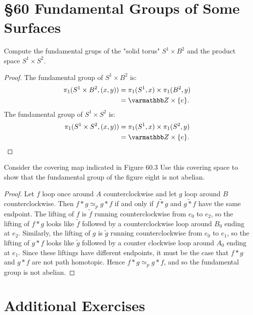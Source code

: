 \documentclass[10pt,oneside,openany]{memoir}
\begin{document}
\section*{\S 60 Fundamental Groups of Some Surfaces}
\begin{exercise}[manual-num={1}]
	Compute the fundamental grups of the "solid torus" $S^1 \times B^2$ and the product space $S^1 \times S^2$.
\end{exercise}
	\begin{proof}
		The fundamental group of $S^1 \times B^2$ is:
		\begin{align*}
			\pi_1(S^1 \times B^2, (x,y))
			&= \pi_1(S^1,x) \times \pi_1(B^2,y) \\
			&= \bfZ \times \{e\}.	
		\end{align*}
		The fundamental group of $S^1 \times S^2$ is:
		\begin{align*}
			\pi_1(S^1 \times S^2, (x,y))
			&= \pi_1(S^1,x) \times \pi_1(S^2,y) \\
			&= \bfZ \times \{e\}.	
		\end{align*}
	\end{proof}
\begin{exercise}[manual-num={5}]
	Consider the covering map indicated in Figure 60.3 Use this covering space to show that the fundamental group of the figure eight is not abelian.
\end{exercise}
	\begin{proof}
		Let $f$ loop once around $A$ counterclockwise and let $g$ loop around $B$ counterclockwise. Then $f \ast g \simeq_p g \ast f$ if and only if $\tilde{f \ast g}$ and $\tilde{g \ast f}$ have the same endpoint. The lifting of $f$ is $\tilde{f}$ running counterclockwise from $e_0$ to $e_2$, so the lifting of $f \ast g$ looks like $\tilde{f}$ followed by a counterclockwise loop around $B_0$ ending at $e_2$. Similarly, the lifting of $g$ is $\tilde{g}$ running counterclockwise from $e_0$ to $e_1$, so the lifting of $g \ast f$ looks like $\tilde{g}$ followed by a counter clockwise loop around $A_0$ ending at $e_1$. Since these liftings have different endpoints, it must be the case that $f \ast g$ and $g \ast f$ are not path homotopic. Hence $f \ast g \simeq_p g \ast f$, and so the fundamental group is not abelian.
	\end{proof}
\section*{Additional Exercises}
\end{document}
